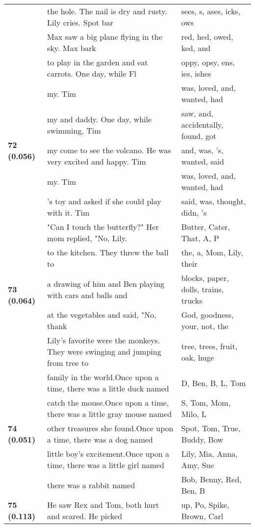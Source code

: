 \documentclass{article}
\begin{document}
\begin{adjustbox}{max width=\textwidth}
\begin{tabular}{p{} p{} p{}}
 & the hole. The nail is dry and rusty. Lily cries. Spot bar & sees, s, ases, icks, ows \\
 & Max saw a big plane flying in the sky.  Max bark & red, hed, owed, ked,  and \\
 & to play in the garden and eat carrots. One day, while Fl & oppy, opsy, ens, ies, ishes \\
\midrule
\multirow{5}{*}{\textbf{72 (0.056)}} & my. Tim & was,  loved,  and,  wanted,  had \\
 & my and daddy. One day, while swimming, Tim & saw,  and,  accidentally,  found,  got \\
 & my come to see the volcano. He was very excited and happy. Tim & and,  was, 's,  wanted,  said \\
 & my. Tim & was,  loved,  and,  wanted,  had \\
 & 's toy and asked if she could play with it. Tim & said,  was,  thought,  didn, 's \\
\midrule
\multirow{5}{*}{\textbf{73 (0.064)}} & "Can I touch the butterfly?" Her mom replied, "No, Lily. & Butter,  Cater,  That,  A,  P \\
 & to the kitchen.  They threw the ball to & the,  a,  Mom,  Lily,  their \\
 & a drawing of him and Ben playing with cars and balls and & blocks,  paper,  dolls,  trains,  trucks \\
 & at the vegetables and said, "No, thank & God,  goodness,  your,  not,  the \\
 & Lily's favorite were the monkeys. They were swinging and jumping from tree to & tree,  trees,  fruit,  oak,  huge \\
\midrule
\multirow{5}{*}{\textbf{74 (0.051)}} & family in the world.Once upon a time, there was a little duck named & D,  Ben,  B,  L,  Tom \\
 & catch the mouse.Once upon a time, there was a little gray mouse named & S,  Tom,  Mom,  Milo,  L \\
 & other treasures she found.Once upon a time, there was a dog named & Spot,  Tom,  True,  Buddy,  Bow \\
 & little boy's excitement.Once upon a time, there was a little girl named & Lily,  Mia,  Anna,  Amy,  Sue \\
 & there was a rabbit named & Bob,  Benny,  Red,  Ben,  B \\
\midrule
\multirow{5}{*}{\textbf{75 (0.113)}} & He saw Rex and Tom, both hurt and scared. He picked & up,  Po,  Spike,  Brown,  Carl \\

\end{tabular}
\end{adjustbox}
\end{document}

